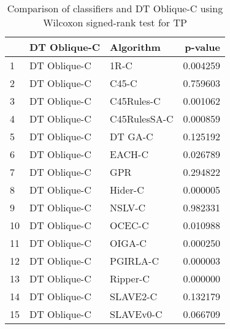\begin{table}
\footnotesize
\caption{Comparison of classifiers and DT Oblique-C using Wilcoxon signed-rank test for TP}
\label{tab:DT Oblique-C wilcoxon TP comparison}
\begin{tabular}{lllr}
\hline
 & DT Oblique-C & Algorithm & p-value \\
\hline
1 & DT Oblique-C & 1R-C & 0.004259 \\
2 & DT Oblique-C & C45-C & 0.759603 \\
3 & DT Oblique-C & C45Rules-C & 0.001062 \\
4 & DT Oblique-C & C45RulesSA-C & 0.000859 \\
5 & DT Oblique-C & DT GA-C & 0.125192 \\
6 & DT Oblique-C & EACH-C & 0.026789 \\
7 & DT Oblique-C & GPR & 0.294822 \\
8 & DT Oblique-C & Hider-C & 0.000005 \\
9 & DT Oblique-C & NSLV-C & 0.982331 \\
10 & DT Oblique-C & OCEC-C & 0.010988 \\
11 & DT Oblique-C & OIGA-C & 0.000250 \\
12 & DT Oblique-C & PGIRLA-C & 0.000003 \\
13 & DT Oblique-C & Ripper-C & 0.000000 \\
14 & DT Oblique-C & SLAVE2-C & 0.132179 \\
15 & DT Oblique-C & SLAVEv0-C & 0.066709 \\
\hline
\end{tabular}
\end{table}
